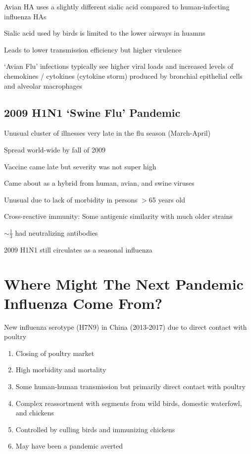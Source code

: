 \documentclass{notes}
\begin{document}
Avian HA uses a slightly different sialic acid compared to human-infecting influenza HAs

\tab Sialic acid used by birds is limited to the lower airways in huamns

\tab \indicates Leads to lower transmission efficiency but higher virulence

`Avian Flu' infections typically see higher viral loads and increased levels of chemokines / cytokines (cytokine storm) produced by bronchial epithelial cells and alveolar macrophages


\subsection{2009 H1N1 `Swine Flu' Pandemic}

Unusual cluster of illnesses very late in the flu season (March-April)

Spread world-wide by fall of 2009

\tab Vaccine came late but severity was not super high

Came about as a hybrid from human, avian, and swine viruses

Unusual due to lack of morbidity in persons \(>\)65 years old

\tab Cross-reactive immunity: Some antigenic similarity with much older strains

\tab \(\sim\frac{1}{3}\) had neutralizing antibodies

2009 H1N1 still circulates as a seasonal influenza

\section{Where Might The Next Pandemic Influenza Come From?}


New influenza serotype (H7N9) in China (2013-2017) due to direct contact with poultry

\begin{enumerate}
    \item Closing of poultry market
    \item High morbidity and mortality
    \item Some human-human transmission but primarily direct contact with poultry
    \item Complex reassortment with segments from wild birds, domestic waterfowl, and chickens
    \item Controlled by culling birds and immunizing chickens
    \item May have been a pandemic averted
\end{enumerate}
\end{document}
